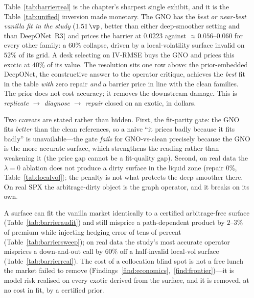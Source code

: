 Table~\ref{tab:barrierreal} is the chapter's sharpest single exhibit, and it is the
Table~\ref{tab:unified} inversion made monetary. The GNO has the \emph{best or near-best
vanilla fit in the study} ($1.51\,\vp$, better than either deep-smoother setting and than
DeepONet~R3) and prices the barrier at $0.0223$ against $\approx0.056$--$0.060$ for every
other family: a $60\%$ collapse, driven by a local-volatility surface invalid on $52\%$ of its
grid. A desk selecting on IV-RMSE buys the GNO and prices this exotic at $40\%$ of its value.
The resolution sits one row above: the prior-embedded DeepONet, the constructive answer to the
operator critique, achieves the \emph{best} fit in the table \emph{with} zero repair \emph{and}
a barrier price in line with the clean families. The prior does not cost accuracy; it removes
the downstream damage. This is \emph{replicate $\to$ diagnose $\to$ repair} closed on an
exotic, in dollars.

Two caveats are stated rather than hidden. First, the fit-parity gate: the GNO fits
\emph{better} than the clean references, so a naive ``it prices badly because it fits badly''
is unavailable---the gate \emph{fails} for GNO-vs-clean precisely because the GNO is the more
accurate surface, which strengthens the reading rather than weakening it (the price gap cannot
be a fit-quality gap). Second, on real data the $\lambda{=}0$ ablation does not produce a dirty
surface in the liquid zone (repair $0\%$, Table~\ref{tab:localvol}); the penalty is not what
protects the deep smoother there. On real SPX the arbitrage-dirty object is the graph operator,
and it breaks on its own.

\begin{finding}\label{find:exotic}
A surface can fit the vanilla market identically to a certified arbitrage-free surface
(Table~\ref{tab:barrieraudit}) and still misprice a path-dependent product by
$2$--$3\%$ of premium while injecting hedging error of tens of percent
(Table~\ref{tab:barriersweep}); on real data the study's most accurate operator misprices a
down-and-out call by $60\%$ off a half-invalid local-vol surface (Table~\ref{tab:barrierreal}).
The cost of a collocation blind spot is not a free lunch the market failed to remove
(Findings~\ref{find:economics},~\ref{find:frontier})---it is model risk realised on every
exotic derived from the surface, and it is removed, at no cost in fit, by a certified prior.
\end{finding}

